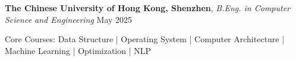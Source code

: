 



\begin{cvhonors}

  \cvhonor
    { {\bf The Chinese University of Hong Kong, Shenzhen}, \textit{B.Eng. in Computer Science and Engineering} \hspace{2.5em} } %
    {May 2025} %


\end{cvhonors}



\begin{cvparagraph}
{\normalsize{ Core Courses:}  Data Structure | Operating System | Computer Architecture | Machine Learning | Optimization | NLP \\}
\end{cvparagraph}




    
